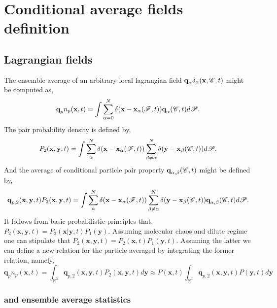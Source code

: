 \section{Conditional average fields definition}

\subsection{Lagrangian fields}
The ensemble average of an arbitrary local lagrangian field $\textbf{q}_\alpha\delta_\alpha(\textbf{x},\mathscr{C},t)$ might be computed as,
\begin{equation*}
    \textbf{q}_pn_p(\textbf{x},t)
    = \int
    \sum_{\alpha=0}^N
    \delta(\textbf{x} - \textbf{x}_\alpha(\mathscr{F},t))
     \textbf{q}_\alpha(\mathscr{C},t) 
     d\mathscr{P}. 
\end{equation*}
The pair probability density is defined by, 
\begin{equation*}
    P_2(\textbf{x},\textbf{y},t)
    = \int
    \sum_{\alpha}^N
    \delta(\textbf{x} - \textbf{x}_\alpha(\mathscr{F},t))
    \sum_{\beta\neq\alpha}^N
    \delta(\textbf{y} - \textbf{x}_\beta(\mathscr{C},t))
     d\mathscr{P}. 
\end{equation*}
And the average of conditional particle pair property $\textbf{q}_{\alpha,\beta}(\mathscr{C},t)$ might be defined by, 
\begin{equation*}
    \textbf{q}_{p,2}(\textbf{x},\textbf{y},t) P_2(\textbf{x},\textbf{y},t)
    = \int
    \sum_{\alpha}^N
    \delta(\textbf{x} - \textbf{x}_\alpha(\mathscr{F},t))
    \sum_{\beta\neq\alpha}^N
    \delta(\textbf{y} - \textbf{x}_\beta(\mathscr{C},t))
    \textbf{q}_{\alpha,\beta}(\mathscr{C},t) 
     d\mathscr{P}. 
\end{equation*}
It follows from basic probabilistic principles that, $P_2(\textbf{x},\textbf{y},t) = P_2(\textbf{x}|\textbf{y},t)P_1(\textbf{y})$. 
Assuming molecular chaos and dilute regime one can stipulate that $P_2(\textbf{x},\textbf{y},t) = P_2(\textbf{x},t)P_1(\textbf{y},t)$. 
Assuming the latter we can define a new relation for the particle averaged by integrating the former relation, namely, 
\begin{equation*}
    \textbf{q}_pn_p(\textbf{x},t)
    =
    \int_{\mathbb{R}^3}
    \textbf{q}_{p,2}(\textbf{x},\textbf{y},t) P_2(\textbf{x},\textbf{y},t)
    d\textbf{y}
    \approx
    P(\textbf{x},t)
    \int_{\mathbb{R}^3}
    \textbf{q}_{p,2}(\textbf{x},\textbf{y},t) P(\textbf{y},t)
    d\textbf{y}
\end{equation*}


\subsubsection*{\citet{batchelor1972sedimentation} and \citet{zhang1994ensemble} ensemble average statistics}

